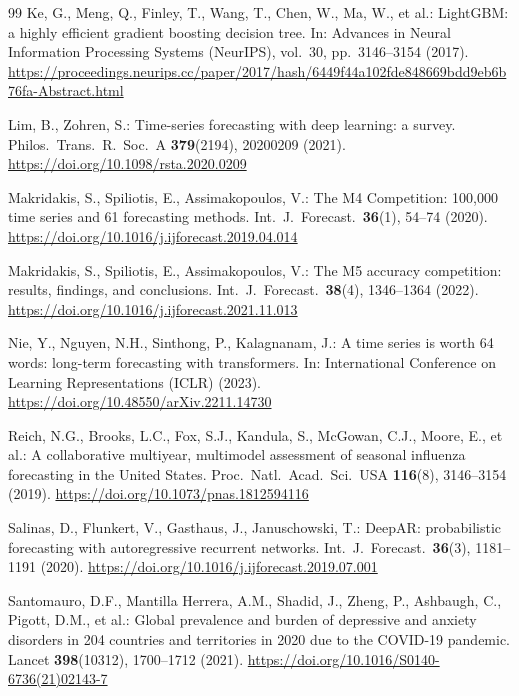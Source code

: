 \documentclass[runningheads]{llncs}
\begin{document}
\begin{thebibliography}{99}
Ke, G., Meng, Q., Finley, T., Wang, T., Chen, W., Ma, W., et al.:
LightGBM: a highly efficient gradient boosting decision tree. In:
Advances in Neural Information Processing Systems (NeurIPS), vol.~30,
pp.~3146--3154 (2017).
\url{https://proceedings.neurips.cc/paper/2017/hash/6449f44a102fde848669bdd9eb6b76fa-Abstract.html}

Lim, B., Zohren, S.: Time-series forecasting with deep learning: a
survey. Philos.\ Trans.\ R.\ Soc.\ A \textbf{379}(2194), 20200209
(2021). \url{https://doi.org/10.1098/rsta.2020.0209}

Makridakis, S., Spiliotis, E., Assimakopoulos, V.: The M4 Competition:
100{,}000 time series and 61 forecasting methods. Int.\ J.\ Forecast.\
\textbf{36}(1), 54--74 (2020).
\url{https://doi.org/10.1016/j.ijforecast.2019.04.014}

Makridakis, S., Spiliotis, E., Assimakopoulos, V.: The M5 accuracy
competition: results, findings, and conclusions. Int.\ J.\ Forecast.\
\textbf{38}(4), 1346--1364 (2022).
\url{https://doi.org/10.1016/j.ijforecast.2021.11.013}

Nie, Y., Nguyen, N.H., Sinthong, P., Kalagnanam, J.: A time series is
worth 64 words: long-term forecasting with transformers. In:
International Conference on Learning Representations (ICLR) (2023).
\url{https://doi.org/10.48550/arXiv.2211.14730}

Reich, N.G., Brooks, L.C., Fox, S.J., Kandula, S., McGowan, C.J., Moore,
E., et al.: A collaborative multiyear, multimodel assessment of seasonal
influenza forecasting in the United States. Proc.\ Natl.\ Acad.\ Sci.\
USA \textbf{116}(8), 3146--3154 (2019).
\url{https://doi.org/10.1073/pnas.1812594116}

\bibitem{salinas2020}
Salinas, D., Flunkert, V., Gasthaus, J., Januschowski, T.: DeepAR:
probabilistic forecasting with autoregressive recurrent networks.
Int.\ J.\ Forecast.\ \textbf{36}(3), 1181--1191 (2020).
\url{https://doi.org/10.1016/j.ijforecast.2019.07.001}

\bibitem{santomauro2021}
Santomauro, D.F., Mantilla Herrera, A.M., Shadid, J., Zheng, P.,
Ashbaugh, C., Pigott, D.M., et al.: Global prevalence and burden of
depressive and
anxiety disorders in 204 countries and territories in 2020 due to the
COVID-19 pandemic. Lancet \textbf{398}(10312), 1700--1712 (2021).
\url{https://doi.org/10.1016/S0140-6736(21)02143-7}


\end{thebibliography}
\end{document}
